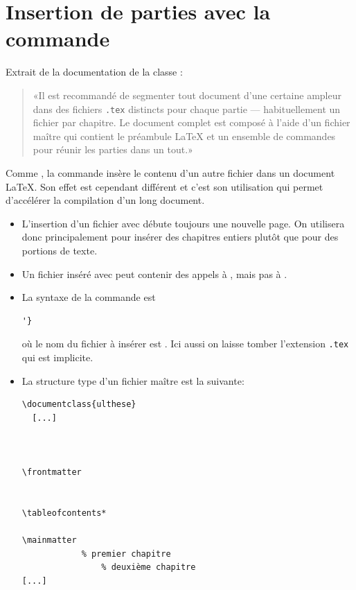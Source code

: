 \section{Insertion de parties avec la commande }
\label{sec:include:include}

Extrait de la documentation de la classe :
\begin{quote}
  «Il est recommandé de segmenter tout document d'une certaine ampleur
  dans des fichiers \verb=.tex= distincts pour chaque partie ---
  habituellement un fichier par chapitre. Le document complet est
  composé à l'aide d'un fichier maître qui contient le préambule
  {\LaTeX} et un ensemble de commandes \verb== pour réunir les
  parties dans un tout.»
\end{quote}

Comme \cmd{}, la commande \cmd{} insère le contenu
d'un autre fichier dans un document {\LaTeX}. Son effet est cependant
différent et c'est son utilisation qui permet d'accélérer la
compilation d'un long document.

\begin{itemize}
\item L'insertion d'un fichier avec \cmd{} débute toujours
  une nouvelle page. On utilisera donc \cmd{} principalement
  pour insérer des chapitres entiers plutôt que pour des portions de
  texte.
\item Un fichier inséré avec \cmd{} peut contenir des appels
  à \cmd{}, mais pas à \cmd{}.
\item La syntaxe de la commande \cmd{} est
\begin{lstlisting}
'}
\end{lstlisting}
  où le nom du fichier à insérer est . Ici
  aussi on laisse tomber l'extension \verb=.tex= qui est implicite.
\item La structure type d'un fichier maître est la suivante:
\begin{lstlisting}
\documentclass{ulthese}
  [...]



\frontmatter


\tableofcontents*

\mainmatter
            % premier chapitre
                % deuxième chapitre
[...]


\end{lstlisting}
\end{itemize}

